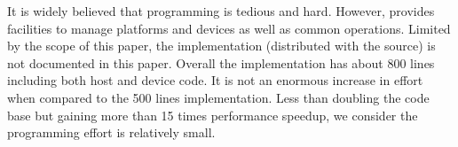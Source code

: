 It is widely believed that \opencl programming is tedious and hard. However,
\vsmc provides facilities to manage \opencl platforms and devices as well as
common operations. Limited by the scope of this paper, the \opencl
implementation (distributed with the \vsmc source) is not documented in this
paper. Overall the \opencl implementation has about 800 lines including both
host and device code. It is not an enormous increase in effort when compared
to the 500 lines \smp implementation. Less than doubling the code base but
gaining more than 15 times performance speedup, we consider the programming
effort is relatively small.
